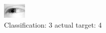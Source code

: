 \begin{figure}[h!]
\begin{center}
\includegraphics[width=0.60\columnwidth]{figures/ID2468_class_3_target_4.png}
\end{center}
\caption{ Classification: 3 actual target: 4}
\label{fig:ID2468_class_3_target_4}
\end{figure}
